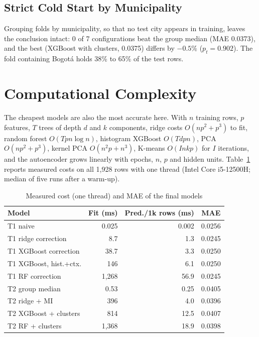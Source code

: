 \documentclass[conference]{IEEEtran}
\begin{document}
\subsection{Strict Cold Start by Municipality}
Grouping folds by municipality, so that no test city appears in training, leaves the conclusion intact: 0 of 7 configurations beat the group median (MAE 0.0373), and the best (XGBoost with clusters, 0.0375) differs by $-0.5\%$ ($p_t=0.902$). The fold containing Bogot\'a holds 38\% to 65\% of the test rows.

\section{Computational Complexity}

The cheapest models are also the most accurate here. With $n$ training rows, $p$ features, $T$ trees of depth $d$ and $k$ components, ridge costs $O(np^2+p^3)$ to fit, random forest $O(Tpn\log n)$, histogram XGBoost $O(Tdpn)$, PCA $O(np^2+p^3)$, kernel PCA $O(n^2p+n^3)$, K-means $O(Inkp)$ for $I$ iterations, and the autoencoder grows linearly with epochs, $n$, $p$ and hidden units. Table~\ref{tab:cost} reports measured costs on all 1,928 rows with one thread (Intel Core i5-12500H; median of five runs after a warm-up).

\begin{table}[!t]
\caption{Measured cost (one thread) and MAE of the final models}
\label{tab:cost}
\centering\footnotesize
\setlength{\tabcolsep}{3pt}
\begin{tabular}{@{}lrrc@{}}
\toprule
Model & Fit (ms) & Pred./1k rows (ms) & MAE \\
\midrule
T1 naive & 0.025 & 0.002 & 0.0256 \\
T1 ridge correction & 8.7 & 1.3 & 0.0245 \\
T1 XGBoost correction & 38.7 & 3.3 & 0.0250 \\
T1 XGBoost, hist.+ctx. & 146 & 6.1 & 0.0250 \\
T1 RF correction & 1,268 & 56.9 & 0.0245 \\
T2 group median & 0.53 & 0.25 & 0.0405 \\
T2 ridge + MI & 396 & 4.0 & 0.0396 \\
T2 XGBoost + clusters & 814 & 12.5 & 0.0407 \\
T2 RF + clusters & 1,368 & 18.9 & 0.0398 \\
\bottomrule
\end{tabular}
\end{table}
\end{document}
